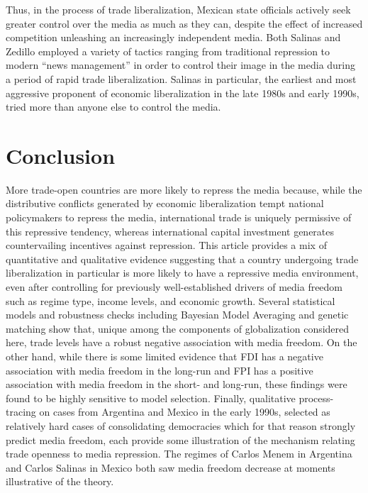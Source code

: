 \documentclass[12pt,a4paper]{article}\usepackage[]{graphicx}\usepackage[]{color}
\begin{document}
Thus, in the process of trade liberalization, Mexican state officials actively seek greater control over the media as much as they can, despite the effect of increased competition unleashing an increasingly independent media. Both Salinas and Zedillo employed a variety of tactics ranging from traditional repression to modern “news management” in order to control their image in the media during a period of rapid trade liberalization. Salinas in particular, the earliest and most aggressive proponent of economic liberalization in the late 1980s and early 1990s, tried more than anyone else to control the media.

\section{Conclusion}

More trade-open countries are more likely to repress the media because, while the distributive conflicts generated by economic liberalization tempt national policymakers to repress the media, international trade is uniquely permissive of this repressive tendency, whereas international capital investment generates countervailing incentives against repression. This article provides a mix of quantitative and qualitative evidence suggesting that a country undergoing trade liberalization in particular is more likely to have a repressive media environment, even after controlling for previously well-established drivers of media freedom such as regime type, income levels, and economic growth. Several statistical models and robustness checks including Bayesian Model Averaging and genetic matching show that, unique among the components of globalization considered here, trade levels have a robust negative association with media freedom. On the other hand, while there is some limited evidence that FDI has a negative association with media freedom in the long-run and FPI has a positive association with media freedom in the short- and long-run, these findings were found to be highly sensitive to model selection. Finally, qualitative process-tracing on cases from Argentina and Mexico in the early 1990s, selected as relatively hard cases of consolidating democracies which for that reason strongly predict media freedom, each provide some illustration of the mechanism relating trade openness to media repression. The regimes of Carlos Menem in Argentina and Carlos Salinas in Mexico both saw media freedom decrease at moments illustrative of the theory.
\end{document}
